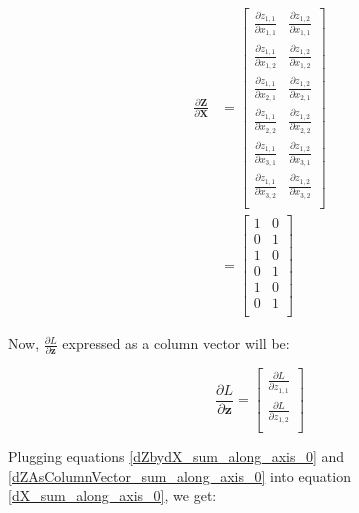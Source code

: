\documentclass{article}
\newcommand{\vecr}[1]{\bm{#1}}
\newcommand{\matr}[1]{\mathbf{#1}} %
\begin{document}
\begin{align}
\frac{\partial \matr{Z}}{\partial \matr{X}} &=
\begin{bmatrix}
\frac{\partial z_{1,1}}{\partial x_{1,1}} & \frac{\partial z_{1,2}}{\partial x_{1,1}} \\[0.7em]
\frac{\partial z_{1,1}}{\partial x_{1,2}} & \frac{\partial z_{1,2}}{\partial x_{1,2}} \\[0.7em]
\frac{\partial z_{1,1}}{\partial x_{2,1}} & \frac{\partial z_{1,2}}{\partial x_{2,1}} \\[0.7em]
\frac{\partial z_{1,1}}{\partial x_{2,2}} & \frac{\partial z_{1,2}}{\partial x_{2,2}} \\[0.7em]
\frac{\partial z_{1,1}}{\partial x_{3,1}} & \frac{\partial z_{1,2}}{\partial x_{3,1}} \\[0.7em]
\frac{\partial z_{1,1}}{\partial x_{3,2}} & \frac{\partial z_{1,2}}{\partial x_{3,2}} \\[0.7em]
\end{bmatrix} \nonumber
\\ \label{dZbydX_sum_along_axis_0}
&=
\begin{bmatrix}
1 & 0 \\%
0 & 1 \\%
1 & 0 \\%
0 & 1 \\%
1 & 0 \\%
0 & 1 \\%
\end{bmatrix}
\end{align}

Now, $\frac{\partial L}{\partial \vecr{z}}$ expressed as a column vector will be:

\begin{equation} \label{dZAsColumnVector_sum_along_axis_0}
\frac{\partial L}{\partial \vecr{z}} =
\begin{bmatrix}
\frac{\partial L}{\partial z_{1,1}} \\[0.7em]
\frac{\partial L}{\partial z_{1,2}} \\[0.7em]
\end{bmatrix}
\end{equation}

Plugging equations \ref{dZbydX_sum_along_axis_0} and \ref{dZAsColumnVector_sum_along_axis_0} into equation \ref{dX_sum_along_axis_0}, we get:
\end{document}
